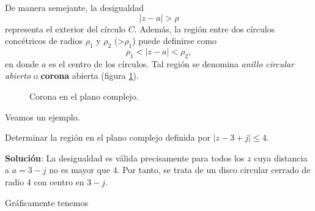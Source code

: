De manera semejante, la desigualdad 
\begin{equation*}
  \lvert z-a \rvert > \rho
\end{equation*}
representa el exterior del círculo $C$. Además, la región entre dos círculos concétricos de radios $\rho_1$ y $\rho_2$ (>$\rho_1$) puede definirse como
\begin{equation}
  \rho_1 < \lvert z-a \rvert < \rho_2,
\end{equation}
en donde $a$ es el centro de los círculos. Tal región se denomina \textit{anillo circular abierto} o \textbf{corona} abierta (figura \ref{fig:corona_complx}).
\begin{figure}[ht]
  \centering
  \caption{Corona en el plano complejo.}
  \label{fig:corona_complx}
\end{figure}

Veamos un ejemplo.
\begin{example}
  Determinar la región en el plano complejo definida por $\lvert z-3+j\rvert\leqslant4$.

  \textbf{Solución}: La desigualdad es válida precisamente para todos los $z$ cuya distancia a $a=3-j$ no es mayor que $4$. Por tanto, se trata de un disco circular cerrado de radio $4$ con centro en $3-j$.

  Gráficamente tenemos
  \begin{figure}[ht]
    \centering
  \end{figure}
\end{example}

